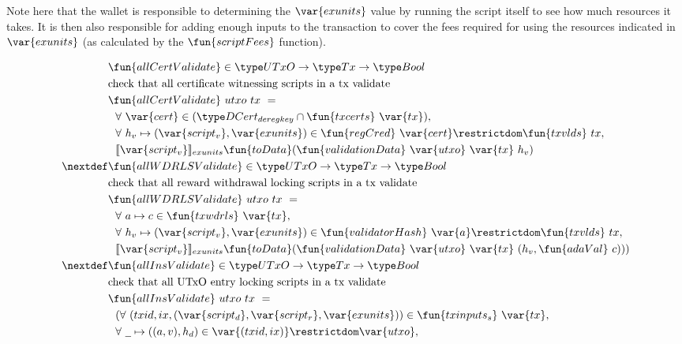 Note here that the wallet is responsible to determining the $\var{exunits}$ value
by running the script itself to see how much resources it takes. It is then
also responsible for adding enough inputs to the transaction to cover the
fees required for using the resources indicated in $\var{exunits}$ (as
calculated by the $\fun{scriptFees}$ function).

\begin{figure}[htb]
  \begin{align*}
    & \fun{allCertValidate} \in \UTxO \to \Tx \to \Bool \\
    & \text{check that all certificate witnessing scripts in a tx validate} \\
    & \fun{allCertValidate}~{utxo}~{tx}~=~ \\
    & ~~\forall~\var{cert} \in
    (\DCertDeRegKey\cap\fun{txcerts}~\var{tx}), \\
    &~~\forall~h_v\mapsto (\var{script_v},\var{exunits})\in \fun{regCred}~\var{cert}\restrictdom\fun{txvlds}~{tx}, \\
    & ~~ \llbracket \var{script_v} \rrbracket_{exunits}
    \fun{toData}(\fun{validationData}~\var{utxo}~\var{tx}~h_v)  \\
    \nextdef
    & \fun{allWDRLSValidate} \in \UTxO \to \Tx \to \Bool \\
    & \text{check that all reward withdrawal locking scripts in a tx validate} \\
    & \fun{allWDRLSValidate}~{utxo}~{tx}~=~ \\
    & ~~\forall~a \mapsto c \in\fun{txwdrls}~\var{tx}, \\
    & ~~ \forall~ h_v\mapsto (\var{script_v},\var{exunits})\in \fun{validatorHash}~\var{a}\restrictdom\fun{txvlds}~{tx}, \\
    & ~~ \llbracket \var{script_v} \rrbracket_{exunits}
    \fun{toData}(\fun{validationData}~\var{utxo}~\var{tx}~
      (h_v,\fun{adaVal}~c)))  \\
    \nextdef
    & \fun{allInsValidate} \in \UTxO \to \Tx \to \Bool \\
    & \text{check that all UTxO entry locking scripts in a tx validate} \\
    & \fun{allInsValidate}~{utxo}~{tx}~=~ \\
    & ~~(\forall~(txid,ix,(\var{script_d},\var{script_r},\var{exunits})) \in
    \fun{txinputs_s}~\var{tx}, \\
    & ~~ \forall~\wcard \mapsto ((a,v),h_d) \in \var{(txid,ix)}\restrictdom\var{utxo}, \\

\end{align*}
\end{figure}
